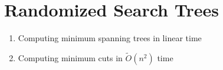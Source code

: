 \section{Randomized Search Trees}

\begin{tcolorbox}[title=Sections, colback=blue!10, colframe=blue]
    \begin{enumerate}
        \item Computing minimum spanning trees in linear time
        \item Computing minimum cuts in $\tilde{O}(n^2)$ time
    \end{enumerate}
\end{tcolorbox}
